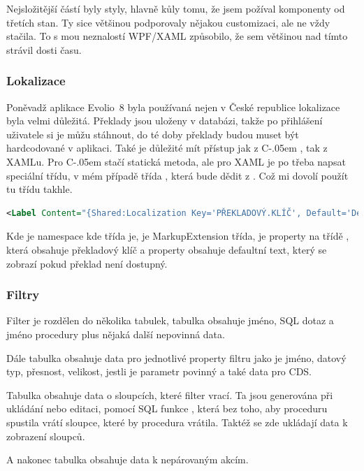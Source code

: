 \documentclass[czech,bachelor,dept460,male,csharp]{diploma}
\newcommand{\EvolioEight}{Evolio~8}
\newcommand{\Csharp}{%
  {\settoheight{\dimen0}{C}C\kern-.05em \resizebox{!}{\dimen0}{\raisebox{\depth}{\#}}}}
\newcommand{\un}{\underline{ }}
\begin{document}
			Nejsložitější částí byly styly, hlavně kůly tomu, že jsem požíval komponenty od třetích stan. Ty sice většinou podporovaly nějakou customizaci, ale ne vždy stačila. To s mou neznalostí WPF/XAML způsobilo, že sem většinou nad tímto strávil dosti času.
		\subsubsection{Lokalizace}
			Poněvadž aplikace {\EvolioEight} byla používaná nejen v České republice lokalizace byla velmi důležitá. Překlady jsou uloženy v databázi, takže po přihlášení uživatele si je můžu stáhnout, do té doby  překlady budou muset být hardcodované v aplikaci. Také je důležité mít přístup jak z {\Csharp}, tak z XAMLu. Pro {\Csharp} stačí statická metoda, ale pro XAML je po třeba napsat speciální třídu, v mém případě třída , která bude dědit z . Což mi dovolí použít tu třídu takhle.
			\begin{lstlisting}[language=XML,caption={MarkupExtension příkad},label=MarkupExtension]
<Label Content="{Shared:Localization Key='PŘEKLADOVÝ.KLÍČ', Default='Defaultní text'}"/>
			\end{lstlisting}
			 
			 Kde  je namespace kde třída  je,  je MarkupExtension třída,  je property na třídě , která obsahuje překladový klíč a property  obsahuje defaultní text, který se zobrazí pokud překlad není dostupný.
		\subsubsection{Filtry}
			Filter je rozdělen do několika tabulek, tabulka  obsahuje jméno, SQL dotaz a jméno procedury plus nějaká další nepovinná data. 
			
			Dále tabulka  obsahuje data pro jednotlivé property filtru jako je jméno, datový typ, přesnost, velikost, jestli je parametr povinný a také data pro CDS. 
			
			Tabulka  obsahuje data o sloupcích, které filter vrací. Ta jsou generována při ukládání nebo editaci, pomocí SQL funkce \uv{sys.sp{\un}describe{\un}first{\un}result{\un}set}, která bez toho, aby proceduru spustila vrátí sloupce, které by procedura vrátila. Taktéž se zde ukládají data k zobrazení sloupců. 
			
			A nakonec tabulka  obsahuje data k nepárovaným akcím.
	
\end{document}

